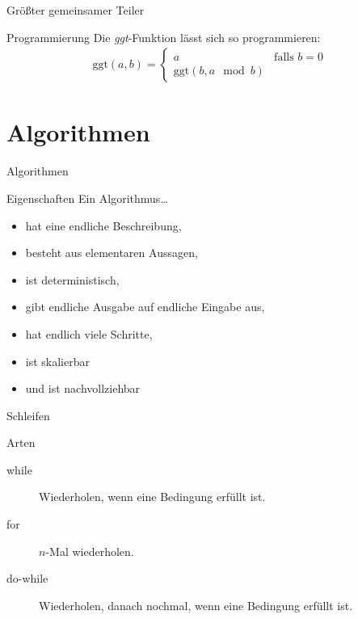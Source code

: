 \documentclass[18pt]{beamer}
\begin{document}
\begin{frame}{Größter gemeinsamer Teiler}
    \begin{exampleblock}{Programmierung}
        Die \emph{ggt}-Funktion lässt sich so programmieren:
        \begin{align*}
            \mathrm{ggt}\left( a, b\right) = \begin{cases} a &\text{falls } b = 0 \\ \mathrm{ggt}\left( b, a\mod b\right)& \end{cases}
        \end{align*}
    \end{exampleblock}
\end{frame}

\section{Algorithmen}

\begin{frame}{Algorithmen}
    \begin{block}{Eigenschaften}
        Ein Algorithmus\dots
        \begin{itemize}
            \item hat eine endliche Beschreibung, 
                \pause
            \item besteht aus elementaren Aussagen,
                \pause
            \item ist deterministisch,
                \pause
            \item gibt endliche Ausgabe auf endliche Eingabe aus,
                \pause
            \item hat endlich viele Schritte,
                \pause
            \item ist skalierbar
                \pause
            \item und ist nachvollziehbar
        \end{itemize}
    \end{block}
\end{frame}

\begin{frame}{Schleifen}
    \begin{block}{Arten}
        \begin{description}
            \item[while] Wiederholen, wenn eine Bedingung erfüllt ist.
                \pause
            \item[for] $n$-Mal wiederholen.
                \pause
            \item[do-while] Wiederholen, danach nochmal, wenn eine Bedingung erfüllt ist.
        \end{description}
    \end{block}
\end{frame}
\end{document}
